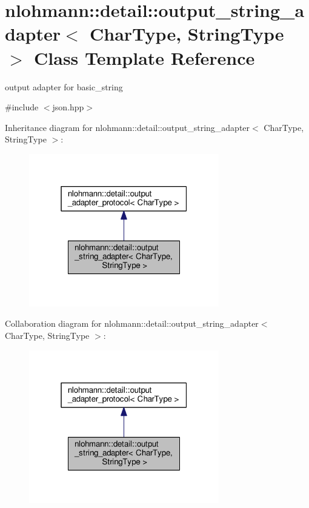 \hypertarget{classnlohmann_1_1detail_1_1output__string__adapter}{}\section{nlohmann\+:\+:detail\+:\+:output\+\_\+string\+\_\+adapter$<$ Char\+Type, String\+Type $>$ Class Template Reference}
\label{classnlohmann_1_1detail_1_1output__string__adapter}


output adapter for basic\+\_\+string  




{\ttfamily \#include $<$json.\+hpp$>$}



Inheritance diagram for nlohmann\+:\+:detail\+:\+:output\+\_\+string\+\_\+adapter$<$ Char\+Type, String\+Type $>$\+:\nopagebreak
\begin{figure}[H]
\begin{center}
\leavevmode
\includegraphics[width=235pt]{classnlohmann_1_1detail_1_1output__string__adapter__inherit__graph}
\end{center}
\end{figure}


Collaboration diagram for nlohmann\+:\+:detail\+:\+:output\+\_\+string\+\_\+adapter$<$ Char\+Type, String\+Type $>$\+:\nopagebreak
\begin{figure}[H]
\begin{center}
\leavevmode
\includegraphics[width=235pt]{classnlohmann_1_1detail_1_1output__string__adapter__coll__graph}
\end{center}
\end{figure}
